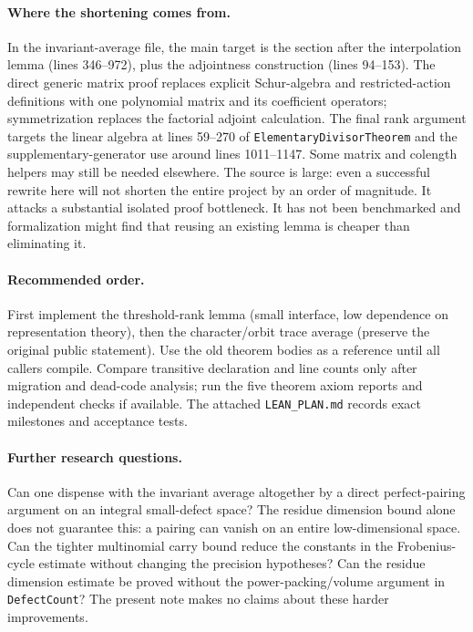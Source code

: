 \documentclass[11pt]{article}
\newcommand{\src}[1]{\texttt{#1}}
\begin{document}
\paragraph{Where the shortening comes from.} In the invariant-average file, the main target is the section after the interpolation lemma (lines 346--972), plus the adjointness construction (lines 94--153). The direct generic matrix proof replaces explicit Schur-algebra and restricted-action definitions with one polynomial matrix and its coefficient operators; symmetrization replaces the factorial adjoint calculation. The final rank argument targets the linear algebra at lines 59--270 of \src{ElementaryDivisorTheorem} and the supplementary-generator use around lines 1011--1147. Some matrix and colength helpers may still be needed elsewhere. The source is large: even a successful rewrite here will not shorten the entire project by an order of magnitude. It attacks a substantial isolated proof bottleneck. It has not been benchmarked and formalization might find that reusing an existing lemma is cheaper than eliminating it.

\paragraph{Recommended order.} First implement the threshold-rank lemma (small interface, low dependence on representation theory), then the character/orbit trace average (preserve the original public statement). Use the old theorem bodies as a reference until all callers compile. Compare transitive declaration and line counts only after migration and dead-code analysis; run the five theorem axiom reports and independent checks if available. The attached \src{LEAN\_PLAN.md} records exact milestones and acceptance tests.

\paragraph{Further research questions.} Can one dispense with the invariant average altogether by a direct perfect-pairing argument on an integral small-defect space? The residue dimension bound alone does not guarantee this: a pairing can vanish on an entire low-dimensional space. Can the tighter multinomial carry bound reduce the constants in the Frobenius-cycle estimate without changing the precision hypotheses? Can the residue dimension estimate be proved without the power-packing/volume argument in \src{DefectCount}? The present note makes no claims about these harder improvements.
\end{document}
